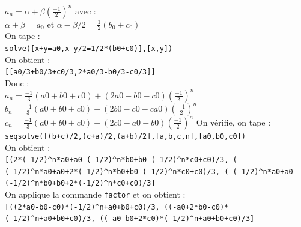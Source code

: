 \documentclass[a4paper,11pt]{book}
\begin{document}
\begin{enumerate}
$a_n=\alpha+\beta(\frac{-1}{2})^n$ avec :\\
$\alpha+\beta=a_0$ et $\alpha-\beta/2=\frac{1}{2}(b_0+c_0)$\\
On tape :\\
{\tt solve([x+y=a0,x-y/2=1/2*(b0+c0)],[x,y])}\\
On obtient :\\
{\tt [[a0/3+b0/3+c0/3,2*a0/3-b0/3-c0/3]]}\\
Donc :\\
$a_n=\frac{-1}{3}(a0+b0+c0)+(2a0-b0-c0)(\frac{-1}{2})^n$
$b_n=\frac{-1}{3}(a0+b0+c0)+(2b0-c0-ca0)(\frac{-1}{2})^n$
$c_n=\frac{-1}{3}(a0+b0+c0)+(2c0-a0-b0)(\frac{-1}{2})^n$
On v\'erifie, on tape :\\
{\tt seqsolve([(b+c)/2,(c+a)/2,(a+b)/2],[a,b,c,n],[a0,b0,c0])}\\
On obtient :\\
{\tt [(2*(-1/2)\verb|^|n*a0+a0-(-1/2)\verb|^|n*b0+b0-(-1/2)\verb|^|n*c0+c0)/3, 
(-(-1/2)\verb|^|n*a0+a0+2*(-1/2)\verb|^|n*b0+b0-(-1/2)\verb|^|n*c0+c0)/3,
(-(-1/2)\verb|^|n*a0+a0-(-1/2)\verb|^|n*b0+b0+2*(-1/2)\verb|^|n*c0+c0)/3]}\\
On applique la commande {\tt factor} et on obtient :\\
{\tt [((2*a0-b0-c0)*(-1/2)\verb|^|n+a0+b0+c0)/3,
((-a0+2*b0-c0)*(-1/2)\verb|^|n+a0+b0+c0)/3,
((-a0-b0+2*c0)*(-1/2)\verb|^|n+a0+b0+c0)/3]}


\end{enumerate}
\end{document}

